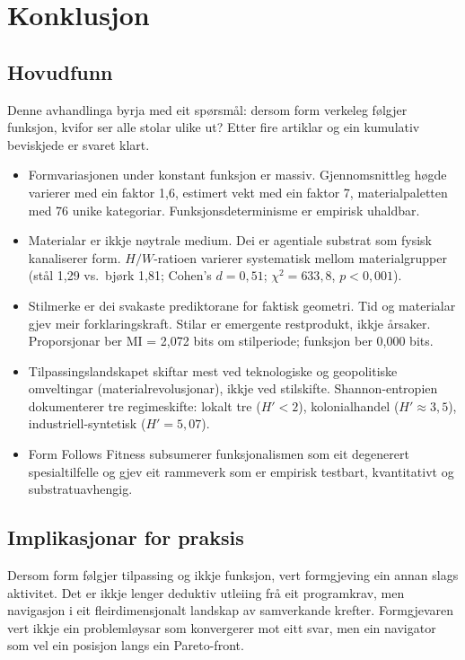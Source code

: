 \documentclass[10pt, a4paper, twocolumn]{article}
\begin{document}
\section{Konklusjon}

\subsection{Hovudfunn}

Denne avhandlinga byrja med eit spørsmål: dersom form verkeleg følgjer funksjon, kvifor ser alle stolar ulike ut? Etter fire artiklar og ein kumulativ beviskjede er svaret klart.

\begin{itemize}
  \item Formvariasjonen under konstant funksjon er massiv. Gjennomsnittleg høgde varierer med ein faktor 1,6, estimert vekt med ein faktor 7, materialpaletten med 76 unike kategoriar. Funksjonsdeterminisme er empirisk uhaldbar.
  \item Materialar er ikkje nøytrale medium. Dei er agentiale substrat som fysisk kanaliserer form. $H/W$-ratioen varierer systematisk mellom materialgrupper (stål 1,29 vs.\ bjørk 1,81; Cohen's $d = 0{,}51$; $\chi^2 = 633{,}8$, $p < 0{,}001$).
  \item Stilmerke er dei svakaste prediktorane for faktisk geometri. Tid og materialar gjev meir forklaringskraft. Stilar er emergente restprodukt, ikkje årsaker. Proporsjonar ber MI = 2,072 bits om stilperiode; funksjon ber 0,000 bits.
  \item Tilpassingslandskapet skiftar mest ved teknologiske og geopolitiske omveltingar (materialrevolusjonar), ikkje ved stilskifte. Shannon-entropien dokumenterer tre regimeskifte: lokalt tre ($H' < 2$), kolonialhandel ($H' \approx 3{,}5$), industriell-syntetisk ($H' = 5{,}07$).
  \item Form Follows Fitness subsumerer funksjonalismen som eit degenerert spesialtilfelle og gjev eit rammeverk som er empirisk testbart, kvantitativt og substratuavhengig.
\end{itemize}

\subsection{Implikasjonar for praksis}

Dersom form følgjer tilpassing og ikkje funksjon, vert formgjeving ein annan slags aktivitet. Det er ikkje lenger deduktiv utleiing frå eit programkrav, men navigasjon i eit fleirdimensjonalt landskap av samverkande krefter. Formgjevaren vert ikkje ein problemløysar som konvergerer mot eitt svar, men ein navigator som vel ein posisjon langs ein Pareto-front.
\end{document}
